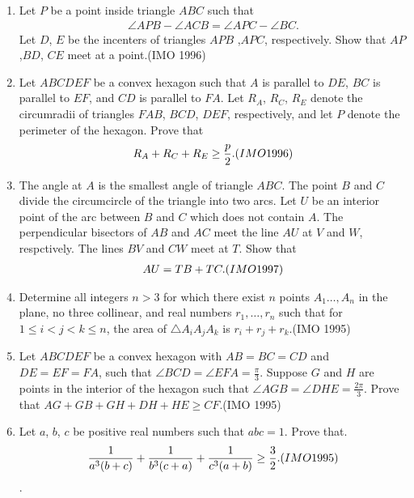 \begin{enumerate}
\item Let $P$ be a point inside triangle $ABC$ such     that                                         
\begin{align}                                      
	\angle{APB}-\angle{ACB}=\angle{APC}-\angle{ BC}.
 \end{align}                                       
Let $D$, $E$ be the incenters of triangles $APB$ ,$APC$, respectively. Show that $AP$ ,$BD$, $CE$ meet at a point.\hfill(IMO 1996)
\item Let $ABCDEF$ be a convex hexagon such that $A$ is parallel to $DE$, $BC$ is parallel to $EF$, and $CD$ is parallel to $FA$. Let $R_A$, $R_C$, $R_E$ denote the circumradii of triangles $FAB$, $BCD$, $DEF$, respectively, and let $P$ denote the perimeter of the hexagon. Prove that            
\begin{align}                                            R_A+R_C+R_E\geq\frac{p}{2}.\hfill(IMO 1996)  
\end{align}
\item The angle at $A$ is the smallest angle of triangle $ABC$. The point $B$ and $C$ divide the circumcircle of the triangle into two arcs. Let $U$ be an interior point of the arc between $B$ and $C$ which does not contain $A$. The perpendicular bisectors of  $AB$ and $AC$ meet the line $AU$ at $V$ and $W$, respctively. The lines $BV$ and $CW$ meet at $T$. Show that
 \begin{align}
AU=TB+TC.\hfill(IMO 1997)
 \end{align}                                   
\item Determine all integers $n>3$ for which there exist $n$ points $A_1\dots,A_n$ in the plane, no three collinear, and real numbers $r_1,\dots,r_n$ such that for $1\leq{i}<{j}<{k}\leq{n}$, the area of $\triangle A_iA_jA_k$ is $r_i+r_j+r_k$.\hfill(IMO 1995)
\item Let $ABCDEF$ be a convex hexagon with $AB=BC=CD$ and $DE=EF=FA$, such that $\angle{BCD}=\angle{EFA}=\frac{\pi}{3}$. Suppose $G$ and $H$ are points in the interior of the hexagon such that $\angle{AGB}=\angle{DHE}=\frac{2\pi}{3}$. Prove that $AG+GB+GH+DH+HE\geq CF$.\hfill (IMO 1995)
\item Let $a$, $b$, $c$ be positive real numbers such that $abc=1$. Prove that.
\begin{align}
\frac{1}{a^3(b+c)}+\frac{1}{b^3(c+a)}+\frac{1}{c^3(a+b)}\geq\frac{3}{2}.\hfill(IMO 1995)
 \end{align}.

\end{enumerate}
